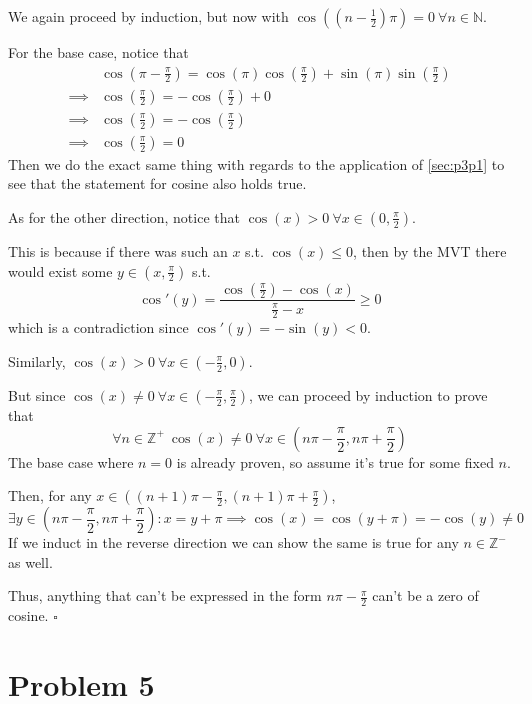 \documentclass[12pt]{article}
\newcommand{\N}{\mathbb{N}}
\newcommand{\Z}{\mathbb{Z}}
\begin{document}
We again proceed by induction, but now with
$\cos\left(\left(n-\frac{1}{2}\right)\pi\right)=0\ \forall n \in \N$.

For the base case, notice that
\begin{align*}
             & \cos\left(\pi-\frac{\pi}{2}\right)
  = \cos(\pi)\cos\left(\frac{\pi}{2}\right) + \sin(\pi)\sin\left(\frac{\pi}{2}\right) \\
  \implies{} & \cos\left(\frac{\pi}{2}\right) = -\cos\left(\frac{\pi}{2}\right) + 0   \\
  \implies{} & \cos\left(\frac{\pi}{2}\right) = -\cos\left(\frac{\pi}{2}\right)       \\
  \implies{} & \cos\left(\frac{\pi}{2}\right) = 0
\end{align*}
Then we do the exact same thing with regards to the application of \ref{sec:p3p1}
to see that the statement for cosine also holds true.

As for the other direction, notice that $\cos(x) > 0\ \forall x \in \left(0, \frac{\pi}{2}\right)$.

This is because if there was such an $x$ s.t. $\cos(x) \le 0$, then
by the MVT there would exist some $y \in \left(x, \frac{\pi}{2}\right)$ s.t.
\[\cos'(y) = \frac{\cos\left(\frac{\pi}{2}\right)-\cos(x)}{\frac{\pi}{2}-x} \ge 0\]
which is a contradiction since $\cos'(y)=-\sin(y)<0$.

Similarly, $\cos(x) > 0\ \forall x \in \left(-\frac{\pi}{2}, 0\right)$.

But since $\cos(x) \ne 0\ \forall x \in \left(-\frac{\pi}{2}, \frac{\pi}{2}\right)$,
we can proceed by induction to prove that
\[\forall n \in \Z^+\ \cos(x) \ne 0\ \forall x \in \left(n\pi-\frac{\pi}{2}, n\pi+\frac{\pi}{2}\right)\]
The base case where $n=0$ is already proven, so assume it's true for some fixed $n$.

Then, for any $x \in \left((n+1)\pi-\frac{\pi}{2}, (n+1)\pi+\frac{\pi}{2}\right)$,
\[\exists y \in \left(n\pi-\frac{\pi}{2}, n\pi+\frac{\pi}{2}\right): x=y+\pi \implies \cos(x)=\cos(y+\pi)=-\cos(y) \ne 0\]
If we induct in the reverse direction we can show the same is true for any $n \in \Z^-$ as well.

Thus, anything that can't be expressed in the form $n\pi-\frac{\pi}{2}$ can't be a zero of cosine. $\square$

\pagebreak

\setcounter{section}{4}

\section{Problem 5}
\end{document}
